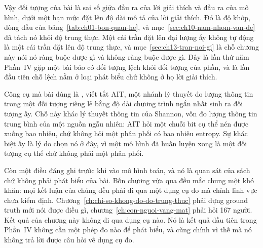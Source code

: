 Vậy đối tượng của bài là sai số giữa đầu ra của lời giải thích và đầu ra của mô
hình, dưới một hạn mức đặt lên độ dài mô tả của lời giải thích. Đó là độ khớp,
dòng đầu của bảng~\ref{tab:ch01-bon-quan-he}, và
mục~\ref{sec:ch10-nam-nhom-van-de} đã tách nó khỏi độ trung thực. Một cái trần
đặt lên đại lượng ấy không tự động là một cái trần đặt lên độ trung thực, và
mục~\ref{sec:ch13-tran-noi-gi} là chỗ chương này nói nó ràng buộc được gì và
không ràng buộc được gì. Đây là lần thứ năm Phần~IV gặp một bài báo có đối tượng
lệch khỏi đối tượng của phần, và là lần đầu tiên chỗ lệch nằm ở loại phát biểu
chứ không ở họ lời giải thích.

%
Công cụ mà bài dùng là , viết tắt AIT, một nhánh lý thuyết đo lượng thông tin trong
một đối tượng riêng lẻ bằng độ dài chương trình ngắn nhất sinh ra đối tượng ấy.
Chỗ này khác lý thuyết thông tin của Shannon, vốn đo lượng thông tin trung bình
của một nguồn ngẫu nhiên: AIT hỏi một chuỗi bit cụ thể nén được xuống bao nhiêu,
chứ không hỏi một phân phối có bao nhiêu entropy. Sự khác biệt ấy là lý do chọn
nó ở đây, vì một mô hình đã huấn luyện xong là một đối tượng cụ thể chứ không
phải một phân phối.

Còn một điều đáng ghi trước khi vào mô hình toán, và nó là quan sát của sách chứ
không phải phát biểu của bài. Bốn chương vừa qua đều mắc chung một khó khăn: mọi
kết luận của chúng đều phải đi qua một dụng cụ đo mà chính lĩnh vực chưa kiểm
định. Chương~\ref{ch:chi-so-khong-do-do-trung-thuc} phải dựng ground truth mới
nói được điều gì, chương~\ref{ch:con-nguoi-vang-mat} phải hỏi 167 người. Kết quả
của chương này không đi qua dụng cụ nào. Nó là kết quả đầu tiên trong Phần~IV
không cần một phép đo nào để phát biểu, và cũng chính vì thế mà nó không trả lời
được câu hỏi về dụng cụ đo.

%
